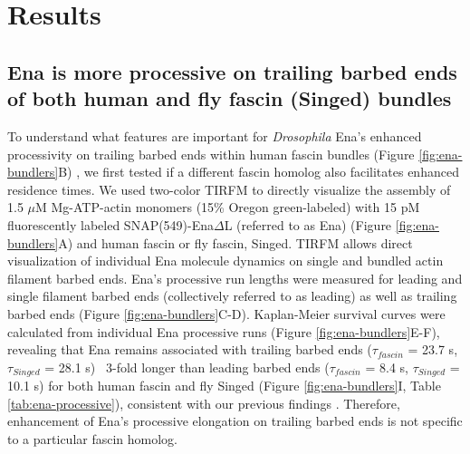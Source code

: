\section{Results}\label{ch02-results}

\subsection{Ena is more processive on trailing barbed ends of both human and fly fascin (Singed) bundles}\label{ena-processive-fascin-singed}

To understand what features are important for \textit{Drosophila} Ena's enhanced processivity on trailing barbed ends within human fascin bundles (Figure \ref{fig:ena-bundlers}B) \citep{winkelman_ena/vasp_2014}, we first tested if a different fascin homolog also facilitates enhanced residence times. We used two-color TIRFM to directly visualize the assembly of 1.5 $\mu$M Mg-ATP-actin monomers (15\% Oregon green-labeled) with 15 pM fluorescently labeled SNAP(549)-Ena$\Delta$L (referred to as Ena) (Figure \ref{fig:ena-bundlers}A) and human fascin or fly fascin, Singed. TIRFM allows direct visualization of individual Ena molecule dynamics on single and bundled actin filament barbed ends. Ena's processive run lengths were measured for leading and single filament barbed ends (collectively referred to as leading) as well as trailing barbed ends (Figure \ref{fig:ena-bundlers}C-D). Kaplan-Meier survival curves were calculated from individual Ena processive runs (Figure \ref{fig:ena-bundlers}E-F), revealing that Ena remains associated with trailing barbed ends ($\tau_{fascin}$ = 23.7 s, $\tau_{Singed}$ = 28.1 s) ~3-fold longer than leading barbed ends ($\tau_{fascin}$ = 8.4 s, $\tau_{Singed}$ = 10.1 s) for both human fascin and fly Singed (Figure \ref{fig:ena-bundlers}I, Table \ref{tab:ena-processive}), consistent with our previous findings \citep{winkelman_ena/vasp_2014}. Therefore, enhancement of Ena's processive elongation on trailing barbed ends is not specific to a particular fascin homolog.

